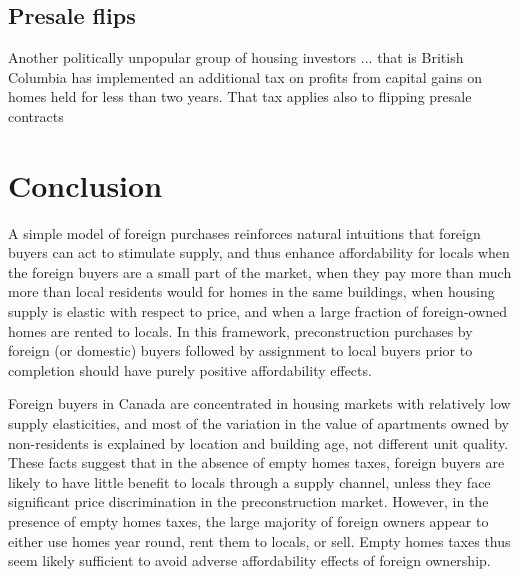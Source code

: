 \documentclass[12pt]{article}
\begin{document}
\subsection{Presale flips}

Another politically unpopular group of housing investors ... that is British Columbia has implemented an additional tax on profits from capital gains on homes held for less than two years. That tax applies also to flipping presale contracts

\section{Conclusion}

A simple model of foreign purchases reinforces natural intuitions that foreign
buyers can act to stimulate supply, and thus enhance affordability for locals
when the foreign buyers are a small part of the market, when they pay more than
much more than local residents would for homes in the same buildings, when
housing supply is elastic with respect to price, and when a large fraction of
foreign-owned homes are rented to locals. In this framework, preconstruction
purchases by foreign (or domestic) buyers followed by assignment to local
buyers prior to completion should have purely positive affordability effects.

Foreign buyers in Canada are concentrated in housing markets with relatively
low supply elasticities, and most of the variation in the value of apartments
owned by non-residents is explained by location and building age, not different
unit quality. These facts suggest that in the absence of empty homes taxes,
foreign buyers are likely to have little benefit to locals through a supply
channel, unless they face significant price discrimination in the
preconstruction market. However, in the presence of empty homes taxes, the
large majority of foreign owners appear to either use homes year round, rent
them to locals, or sell. Empty homes taxes thus seem likely sufficient to avoid
adverse affordability effects of foreign ownership.

\printbibliography
\end{document}
